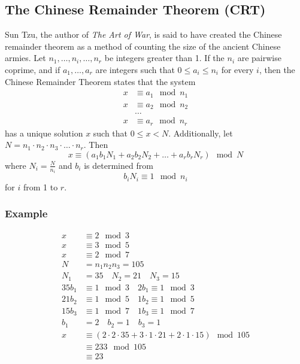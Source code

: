 \documentclass{math}
\begin{document}
\subsection*{The Chinese Remainder Theorem (CRT)}
Sun Tzu, the author of \textit{The Art of War}, is said to have created the
Chinese remainder theorem as a method of counting the size of the ancient
Chinese armies. Let \( n_1,\dots,n_i,\dots,n_r \) be integers greater than 1.
If the \( n_i \) are pairwise coprime, and if \( a_1,\dots,a_r \) are integers
such that \( 0\le a_i\le n_i \) for every \( i \), then the Chinese Remainder
Theorem states that the system
\begin{align*}
  x &\equiv a_1\mod n_1 \\
  x &\equiv a_2\mod n_2 \\
  &\dots \\
  x &\equiv a_r\mod n_r
\end{align*}
has a unique solution \( x \) such that \( 0\le x<N \). Additionally, let
\( N = n_1\cdot n_2\cdot n_3\cdot\dots\cdot n_r \). Then
\[ x \equiv (a_1b_1N_1+a_2b_2N_2+\dots+a_rb_rN_r)\mod N \]
where \( N_i = \frac{N}{n_i} \) and \( b_i \) is determined from
\[ b_iN_i \equiv 1\mod n_i \]
for \( i \) from 1 to \( r \).

\subsubsection*{Example}
\begin{align*}
  x &\equiv 2\mod3 \\
  x &\equiv 3\mod5 \\
  x &\equiv 2\mod7 \\
  N &= n_1n_2n_3 = 105 \\
  N_1 &= 35 \quad N_2 = 21 \quad N_3 = 15 \\
  35b_1 &\equiv 1\mod3 \quad 2b_1 \equiv 1\mod3 \\
  21b_2 &\equiv 1\mod5 \quad 1b_2 \equiv 1\mod5 \\
  15b_3 &\equiv 1\mod7 \quad 1b_3 \equiv 1\mod7 \\
  b_1 &= 2 \quad b_2 = 1 \quad b_3 = 1 \\
  x &\equiv (2\cdot2\cdot35+3\cdot1\cdot21+2\cdot1\cdot15)\mod105 \\
  &\equiv 233\mod105 \\
  &\equiv 23
\end{align*}
\end{document}

